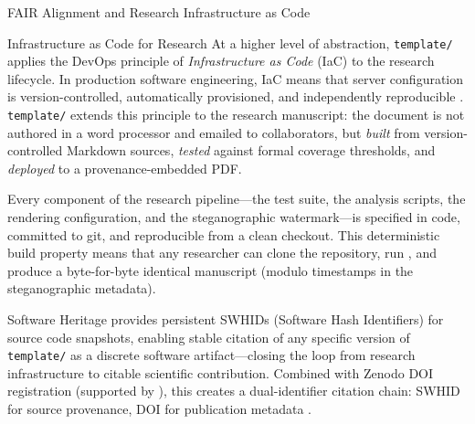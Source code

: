 \documentclass[
  ignorenonframetext,
]{beamer}
\begin{document}
\begin{frame}{FAIR Alignment and Research
Infrastructure as Code}
\begin{block}{Infrastructure as Code for Research}
\protect{}\label{infrastructure-as-code-for-research}
At a higher level of abstraction, \texttt{template/} applies the DevOps
principle of \emph{Infrastructure as Code} (IaC) to the research
lifecycle. In production software engineering, IaC means that server
configuration is version-controlled, automatically provisioned, and
independently reproducible . \texttt{template/}
extends this principle to the research manuscript: the document is not
authored in a word processor and emailed to collaborators, but
\emph{built} from version-controlled Markdown sources, \emph{tested}
against formal coverage thresholds, and \emph{deployed} to a
provenance-embedded PDF.

Every component of the research pipeline---the test suite, the analysis
scripts, the rendering configuration, and the steganographic
watermark---is specified in code, committed to git, and reproducible
from a clean checkout. This deterministic build property means that any
researcher can clone the repository, run
, and produce a byte-for-byte identical
manuscript (modulo timestamps in the steganographic metadata).

Software Heritage  provides persistent
SWHIDs (Software Hash Identifiers) for source code snapshots, enabling
stable citation of any specific version of \texttt{template/} as a
discrete software artifact---closing the loop from research
infrastructure to citable scientific contribution. Combined with Zenodo
DOI registration (supported by ), this
creates a dual-identifier citation chain: SWHID for source provenance,
DOI for publication metadata .
\end{block}
\end{frame}
\end{document}
